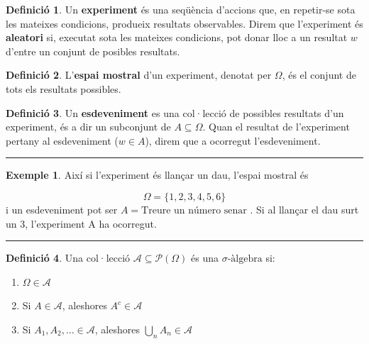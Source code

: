 \documentclass[
  catalan,
]{article}
\providecommand{\tightlist}{%
  \setlength{\itemsep}{0pt}\setlength{\parskip}{0pt}}
\theoremstyle{definition}
\newtheorem{definition}{Definició}[section]
\theoremstyle{definition}
\newtheorem{example}{Exemple}[section]
\theoremstyle{definition}
\theoremstyle{definition}
\theoremstyle{remark}
\begin{document}
\begin{definition}
Un \textbf{experiment} és una seqüència d'accions que, en repetir-se sota les mateixes condicions, produeix resultats observables. Direm que l'experiment és \textbf{aleatori} si, executat sota les mateixes condicions, pot donar lloc a un resultat \(w\) d'entre un conjunt de posibles resultats.
\end{definition}

\begin{definition}
L'\textbf{espai mostral} d'un experiment, denotat per \(\Omega\), és el conjunt de tots els resultats possibles.
\end{definition}

\begin{definition}
Un \textbf{esdeveniment} es una col·lecció de possibles resultats d'un experiment, és a dir un subconjunt de \(A \subseteq \Omega\). Quan el resultat de l'experiment pertany al esdeveniment (\(w \in A\)), direm que a ocorregut l'esdeveniment.
\end{definition}

\begin{center}\rule{0.5\linewidth}{0.5pt}\end{center}

\begin{example}
Així si l'experiment és llançar un dau, l'espai mostral és

\[\Omega = \{1,2,3,4,5,6\}\] i un esdeveniment pot ser \(A=\text{Treure un número senar}\) . Si al llançar el dau surt un 3, l'experiment A ha ocorregut.
\end{example}

\begin{center}\rule{0.5\linewidth}{0.5pt}\end{center}

\begin{definition}

Una col·lecció \(\mathcal{A}\subseteq \mathcal{P}(\Omega)\) és una \textbf{\(\sigma\text{-àlgebra}\)} si:

\begin{enumerate}
\def\labelenumi{\arabic{enumi}.}
\tightlist
\item
  \(\Omega\in\mathcal{A}\)\\
\item
  Si \(A\in\mathcal{A}\), aleshores \(A^c\in\mathcal{A}\)\\
\item
  Si \(A_1,A_2,\ldots\in\mathcal{A}\), aleshores \(\bigcup_{n}A_n\in\mathcal{A}\)
\end{enumerate}

\end{definition}
\end{document}
